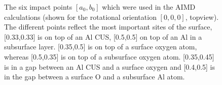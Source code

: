\documentclass[11pt,DIV=13,BCOR=5mm,a4paper,headinclude]{scrbook}
\begin{document}
\begin{figure}[h!]
        \quad
        \quad
 \caption{The six impact points $[a_0,b_0]$ which were used in the AIMD calculations (shown for the rotational orientation $[0,0,0]$, topview). The different points reflect the most important sites of the surface, [0.33,0.33] is on top of an Al CUS, [0.5,0.5] on top of an Al in a subsurface layer.
[0.35,0.5] is on top of a surface oxygen atom, whereas [0.5,0.35] is on top of a subsurface oxygen atom.
[0.35,0.45] is in a gap between an Al CUS and a surface oxygen and [0.4,0.5] is in the gap between a surface O and a subsurface Al atom.}
        \label{abb:impact_points}
 \end{figure}
 
\end{document}

